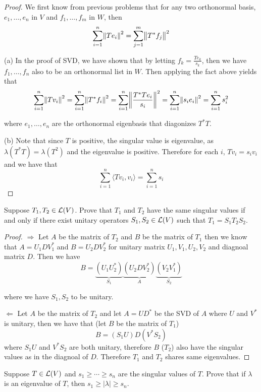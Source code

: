 \documentclass{extarticle}
\begin{document}
\begin{proof}
We first know from previous problems that for any two orthonormal basis, \(e_1, \ldots, e_n\)
in \(V\) and \(f_1, \ldots, f_m\) in \(W\), then 
\[\sum_{i=1}^{n} \norm{Te_i}^2 = \sum_{j=1}^{m} \norm{T^* f_j}^2\]

(a) In the proof of SVD, we have shown that by letting \(f_k = \frac{Te_k}{s_k}\), then we have 
\(f_1, \ldots, f_n\) also to be an orthonormal list in \(W\). Then applying the fact above yields 
that 
\[\sum_{i=1}^{n} \norm{T v_i}^2 = \sum_{i=1}^{n} \norm{T^*f_i}^2 = 
\sum_{i=1}^{n} \norm{ \frac{T^*T e_i}{s_i}}^2 = \sum_{i=1}^{n} \norm{s_i e_i}^2 = \sum_{i=1}^{n} s_i^2\]

where \(e_1, \ldots, e_n\) are the orthonormal eigenbasis that diagonizes \(T^*T\). 


(b) Note that since \(T\) is positive, the singular value is eigenvalue, as \(\lambda(T^*T) 
= \lambda(T^2)\) and the eigenvalue is positive. Therefore for each \(i\), \(T v_i = s_i v_i\)
and we have that 
\[\sum_{i=1}^{n} \langle Tv_i,v_i \rangle = \sum_{i=1}^{n} s_i\]
\end{proof}


\begin{problem}{13}
    Suppose \(T_1, T_2 \in \mathcal{L}(V)\). Prove that \(T_1\) and \(T_2\) have the same singular values 
    if and only if there exist unitary operators \(S_1, S_2 \in \mathcal{L}(V)\) such that \(T_1 
    = S_1 T_2 S_2\).
\end{problem}

\begin{proof}
\(\Rightarrow\) Let \(A\) be the matrix of \(T_2\) and \(B\) be the matrix of \(T_1\) then we know that 
\(A = U_1 D V_1^*\) and \(B = U_2 D V_2^*\) for unitary matrix \(U_1, V_1, U_2, V_2\) and 
diagnoal matrix \(D\). Then we have 
\[B = \underbrace{(U_1 U_2^*)}_{S_1} \underbrace{(U_2 D V_2^*)}_A \underbrace{(V_2 V_1^*)}_{S_2} \]

where we have \(S_1, S_2\) to be unitary. 

\(\Leftarrow\) Let \(A\) be the matrix of \(T_2\) and let \(A = UD^*\) be the SVD of \(A\) where 
\(U\) and \(V^*\) is unitary, then we have that (let \(B\) be the matrix of \(T_1\))
\[B = (S_1 U)D(V^*S_2)\]
where \(S_1 U\) and \(V^*S_2\) are both unitary, therefore \(B\) (\(T_2\)) also have the singular values 
as in the diagnoal of \(D\). Therefore \(T_1\) and \(T_2\) shares same eigenvalues.  
\end{proof}


\begin{problem}{15}
    Suppose \(T \in \mathcal{L}(V)\) and \(s_1 \geq \cdots \geq s_n\) are the singular values of \(T\). 
    Prove that if \(\lambda\) is an eigenvalue of \(T\), then \(s_1 \geq |\lambda| \geq s_n\).
\end{problem}
\end{document}
